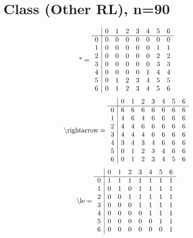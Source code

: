 \documentclass[11pt]{article}
\begin{document}
\section{Class (Other RL), n=90}
\[\text{*} = 
\begin{array}{r | r r r r r r r}
 & 0 & 1 & 2 & 3 & 4 & 5 & 6 \\ \hline
0 & 0 & 0 & 0 & 0 & 0 & 0 & 0 \\
1 & 0 & 0 & 0 & 0 & 0 & 1 & 1 \\
2 & 0 & 0 & 0 & 0 & 0 & 2 & 2 \\
3 & 0 & 0 & 0 & 0 & 0 & 3 & 3 \\
4 & 0 & 0 & 0 & 0 & 1 & 4 & 4 \\
5 & 0 & 1 & 2 & 3 & 4 & 5 & 5 \\
6 & 0 & 1 & 2 & 3 & 4 & 5 & 6 \\
\end{array}
\]
\[\text{\textbackslash rightarrow} = 
\begin{array}{r | r r r r r r r}
 & 0 & 1 & 2 & 3 & 4 & 5 & 6 \\ \hline
0 & 6 & 6 & 6 & 6 & 6 & 6 & 6 \\
1 & 4 & 6 & 4 & 6 & 6 & 6 & 6 \\
2 & 4 & 4 & 6 & 6 & 6 & 6 & 6 \\
3 & 4 & 4 & 4 & 6 & 6 & 6 & 6 \\
4 & 3 & 4 & 3 & 4 & 6 & 6 & 6 \\
5 & 0 & 1 & 2 & 3 & 4 & 6 & 6 \\
6 & 0 & 1 & 2 & 3 & 4 & 5 & 6 \\
\end{array}
\]
\[\text{\textbackslash le} = 
\begin{array}{r | r r r r r r r}
 & 0 & 1 & 2 & 3 & 4 & 5 & 6 \\ \hline
0 & 1 & 1 & 1 & 1 & 1 & 1 & 1 \\
1 & 0 & 1 & 0 & 1 & 1 & 1 & 1 \\
2 & 0 & 0 & 1 & 1 & 1 & 1 & 1 \\
3 & 0 & 0 & 0 & 1 & 1 & 1 & 1 \\
4 & 0 & 0 & 0 & 0 & 1 & 1 & 1 \\
5 & 0 & 0 & 0 & 0 & 0 & 1 & 1 \\
6 & 0 & 0 & 0 & 0 & 0 & 0 & 1 \\
\end{array}
\]
\end{document}
